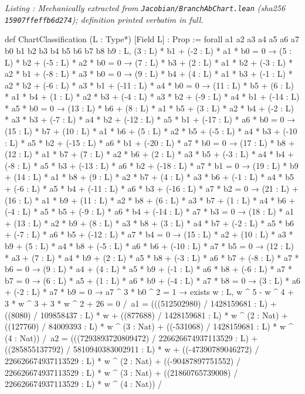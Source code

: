 \documentclass[a4paper,11pt]{article}
\newcounter{leanlisting}
\newenvironment{leanlisting}[2]{%
  \refstepcounter{leanlisting}\label{#2}%
  \begin{center}\textit{\small Listing \theleanlisting: #1}\end{center}%
  \Verbatim[breaklines=true,breakanywhere=true,fontsize=\footnotesize,frame=single,framesep=4pt,rulecolor=\color{gray!50},fillcolor=\color{gray!5}]%
}{%
  \endVerbatim%
}
\theoremstyle{plain}
\theoremstyle{definition}
\theoremstyle{remark}
\begin{document}
\begin{leanlisting}{Mechanically extracted from \texttt{Jacobian/BranchAbChart.lean} (sha256 \texttt{15907ffeffb6d274}); definition printed verbatim in full.}{lst:def-chartclass}
def ChartClassification (L : Type*) [Field L] : Prop :=
  forall a1 a2 a3 a4 a5 a6 a7 b0 b1 b2 b3 b4 b5 b6 b7 b8 b9 : L,
    (3 : L) * b1 + (-2 : L) * a1 * b0 = 0 →
    (5 : L) * b2 + (-5 : L) * a2 * b0 = 0 →
    (7 : L) * b3 + (2 : L) * a1 * b2 + (-3 : L) * a2 * b1 + (-8 : L) * a3 * b0 = 0 →
    (9 : L) * b4 + (4 : L) * a1 * b3 + (-1 : L) * a2 * b2 + (-6 : L) * a3 * b1 + (-11 : L) * a4 * b0 = 0 →
    (11 : L) * b5 + (6 : L) * a1 * b4 + (1 : L) * a2 * b3 + (-4 : L) * a3 * b2 + (-9 : L) * a4 * b1 + (-14 : L) * a5 * b0 = 0 →
    (13 : L) * b6 + (8 : L) * a1 * b5 + (3 : L) * a2 * b4 + (-2 : L) * a3 * b3 + (-7 : L) * a4 * b2 + (-12 : L) * a5 * b1 + (-17 : L) * a6 * b0 = 0 →
    (15 : L) * b7 + (10 : L) * a1 * b6 + (5 : L) * a2 * b5 + (-5 : L) * a4 * b3 + (-10 : L) * a5 * b2 + (-15 : L) * a6 * b1 + (-20 : L) * a7 * b0 = 0 →
    (17 : L) * b8 + (12 : L) * a1 * b7 + (7 : L) * a2 * b6 + (2 : L) * a3 * b5 + (-3 : L) * a4 * b4 + (-8 : L) * a5 * b3 + (-13 : L) * a6 * b2 + (-18 : L) * a7 * b1 = 0 →
    (19 : L) * b9 + (14 : L) * a1 * b8 + (9 : L) * a2 * b7 + (4 : L) * a3 * b6 + (-1 : L) * a4 * b5 + (-6 : L) * a5 * b4 + (-11 : L) * a6 * b3 + (-16 : L) * a7 * b2 = 0 →
    (21 : L) + (16 : L) * a1 * b9 + (11 : L) * a2 * b8 + (6 : L) * a3 * b7 + (1 : L) * a4 * b6 + (-4 : L) * a5 * b5 + (-9 : L) * a6 * b4 + (-14 : L) * a7 * b3 = 0 →
    (18 : L) * a1 + (13 : L) * a2 * b9 + (8 : L) * a3 * b8 + (3 : L) * a4 * b7 + (-2 : L) * a5 * b6 + (-7 : L) * a6 * b5 + (-12 : L) * a7 * b4 = 0 →
    (15 : L) * a2 + (10 : L) * a3 * b9 + (5 : L) * a4 * b8 + (-5 : L) * a6 * b6 + (-10 : L) * a7 * b5 = 0 →
    (12 : L) * a3 + (7 : L) * a4 * b9 + (2 : L) * a5 * b8 + (-3 : L) * a6 * b7 + (-8 : L) * a7 * b6 = 0 →
    (9 : L) * a4 + (4 : L) * a5 * b9 + (-1 : L) * a6 * b8 + (-6 : L) * a7 * b7 = 0 →
    (6 : L) * a5 + (1 : L) * a6 * b9 + (-4 : L) * a7 * b8 = 0 →
    (3 : L) * a6 + (-2 : L) * a7 * b9 = 0 →
    a7 ^ 3 * b0 ^ 2 = 1 →
    exists w : L, w ^ 5 - w ^ 4 + 3 * w ^ 3 + 3 * w ^ 2 + 26 = 0 /\
      a1 = (((512502980) / 1428159681 : L) + ((8080) / 109858437 : L) * w + ((877688) / 1428159681 : L) * w ^ (2 : Nat) + ((127760) / 84009393 : L) * w ^ (3 : Nat) + ((-531068) / 1428159681 : L) * w ^ (4 : Nat)) /\
      a2 = (((7293893720809472) / 226626674937113529 : L) + ((285855137792) / 5810940383002911 : L) * w + ((-47390789046272) / 226626674937113529 : L) * w ^ (2 : Nat) + ((-90487897751552) / 226626674937113529 : L) * w ^ (3 : Nat) + ((21860765739008) / 226626674937113529 : L) * w ^ (4 : Nat)) /\

\end{leanlisting}
\end{document}
